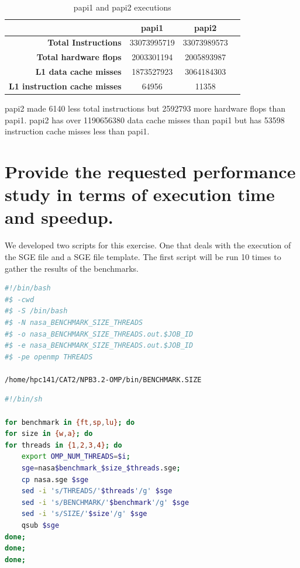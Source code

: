 \documentclass[11pt]{article}
\begin{document}
\begin{table}[]
\begin{tabular}{|r|c|c|c|}
\hline
  &  \textbf{papi1} & \textbf{papi2}  \\ \hline
 \textbf{Total Instructions} &  33073995719 & 33073989573   \\ \hline
\textbf{Total hardware flops} &  2003301194 & 2005893987  \\ \hline
 \textbf{L1 data cache misses} & 1873527923 & 3064184303  \\ \hline
 \textbf{L1 instruction cache misses} & 64956 & 11358  \\ \hline
\end{tabular}
\caption{papi1 and papi2 executions}
\label{tab:papi_exec}
\end{table}

papi2 made 6140 less total instructions but 2592793 more hardware flops than papi1. papi2 has over 1190656380 data cache misses than papi1 but has 53598 instruction cache misses less than papi1.


\hypertarget{7}{%
\section{ Provide the requested performance study in terms of execution time and speedup.}\label{7}}

We developed two scripts for this exercise. One that deals with the execution of the SGE file and a SGE file template. The first script will be run 10 times to gather the results of the benchmarks.

\begin{lstlisting}[language=bash,caption=nasa.sge: NPB SGE template file]
#!/bin/bash
#$ -cwd
#$ -S /bin/bash
#$ -N nasa_BENCHMARK_SIZE_THREADS
#$ -o nasa_BENCHMARK_SIZE_THREADS.out.$JOB_ID
#$ -e nasa_BENCHMARK_SIZE_THREADS.out.$JOB_ID
#$ -pe openmp THREADS

/home/hpc141/CAT2/NPB3.2-OMP/bin/BENCHMARK.SIZE
\end{lstlisting}

\begin{lstlisting}[language=bash,caption=nasa.sh: Helper script]
#!/bin/sh

for benchmark in {ft,sp,lu}; do
for size in {w,a}; do
for threads in {1,2,3,4}; do
	export OMP_NUM_THREADS=$i;
	sge=nasa$benchmark_$size_$threads.sge;
	cp nasa.sge $sge
	sed -i 's/THREADS/'$threads'/g' $sge
	sed -i 's/BENCHMARK/'$benchmark'/g' $sge
	sed -i 's/SIZE/'$size'/g' $sge
	qsub $sge
done;
done;
done;
\end{lstlisting}
\end{document}
